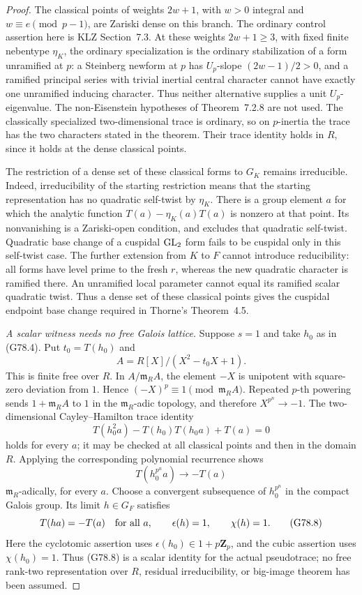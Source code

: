 \begin{proof}
The classical points of weights \(2w+1\), with \(w>0\) integral
and \(w\equiv e\pmod{p-1}\), are Zariski dense on this branch.
The ordinary control assertion here is KLZ Section~7.3.
At these weights \(2w+1\ge3\), with fixed finite nebentype
\(\eta_K\), the ordinary specialization is the ordinary
stabilization of a form unramified at \(p\): a Steinberg
newform at \(p\) has \(U_p\)-slope \((2w-1)/2>0\), and
a ramified principal series with trivial inertial central
character cannot have exactly one unramified inducing
character.  Thus neither alternative supplies a unit
\(U_p\)-eigenvalue.
The non-Eisenstein hypotheses of Theorem~7.2.8 are not used.
The classically specialized two-dimensional trace is ordinary,
so on \(p\)-inertia the trace has the two characters stated in
the theorem.  Their trace identity holds in \(R\), since it
holds at the dense classical points.

The restriction of a dense set of these classical forms to
\(G_K\) remains irreducible.  Indeed, irreducibility of the
starting restriction means that the starting representation
has no quadratic self-twist by \(\eta_K\).
There is a group element \(a\) for which the analytic function
\(T(a)-\eta_K(a)T(a)\) is nonzero at that point.
Its nonvanishing is a Zariski-open condition, and excludes
that quadratic self-twist.
Quadratic base change of a cuspidal \({\rm GL}_2\) form fails
to be cuspidal only in this self-twist case.
The further extension from \(K\) to \(F\) cannot introduce
reducibility: all forms have level prime to the fresh \(r\),
whereas the new quadratic character is ramified there.
An unramified local parameter cannot equal its ramified
scalar quadratic twist.
Thus a dense set of these classical points gives the
cuspidal endpoint base change required in Thorne's
Theorem~4.5.

\emph{A scalar witness needs no free Galois lattice.}
Suppose \(s=1\) and take \(h_0\) as in (G78.4).
Put \(t_0=T(h_0)\) and
\[
 A=R[X]/(X^2-t_0X+1).
\]
This is finite free over \(R\).  In \(A/\mathfrak m_RA\),
the element \(-X\) is unipotent with square-zero deviation
from \(1\).
Hence \((-X)^p\equiv1\pmod{\mathfrak m_RA}\).
Repeated \(p\)-th powering sends \(1+\mathfrak m_RA\) to \(1\)
in the \(\mathfrak m_R\)-adic topology, and therefore
\(X^{p^n}\to-1\).
The two-dimensional Cayley--Hamilton trace identity
\[
 T(h_0^2a)-T(h_0)T(h_0a)+T(a)=0
 \tag{G78.7}
\]
holds for every \(a\); it may be checked at all classical
points and then in the domain \(R\).
Applying the corresponding polynomial recurrence shows
\[
                     T(h_0^{p^n}a)\longrightarrow -T(a)
\]
\(\mathfrak m_R\)-adically, for every \(a\).
Choose a convergent subsequence of \(h_0^{p^n}\) in the
compact Galois group.  Its limit \(h\in G_F\) satisfies
\[
 T(ha)=-T(a)\quad\hbox{for all }a,\qquad
 \epsilon(h)=1,\qquad\chi(h)=1.
 \tag{G78.8}
\]
Here the cyclotomic assertion uses
\(\epsilon(h_0)\in1+p\mathbf Z_p\), and the cubic assertion
uses \(\chi(h_0)=1\).
Thus (G78.8) is a scalar identity for the actual pseudotrace;
no free rank-two representation over \(R\), residual
irreducibility, or big-image theorem has been assumed.


\end{proof}

